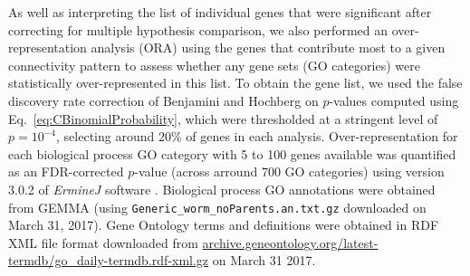 \documentclass[10pt,letterpaper]{article}
\begin{document}
As well as interpreting the list of individual genes that were significant after correcting for multiple hypothesis comparison, we also performed an over-representation analysis (ORA) using the genes that contribute most to a given connectivity pattern to assess whether any gene sets (GO categories) were statistically over-represented in this list.
To obtain the gene list, we used the false discovery rate correction of Benjamini and Hochberg \cite{Benjamini:1995cd} on $p$-values computed using Eq.~\eqref{eq:CBinomialProbability}, which were thresholded at a stringent level of $p = 10^{-4}$, selecting around $20\%$ of genes in each analysis.
Over-representation for each biological process GO category with 5 to 100 genes available was quantified as an FDR-corrected $p$-value (across arround 700 GO categories) using version 3.0.2 of \emph{ErmineJ} software \cite{Gillis2010}.
Biological process GO annotations \cite{Ashburner2000} were obtained from GEMMA \cite{Zoubarev2012} (using \texttt{Generic\_worm\_noParents.an.txt.gz} downloaded on March 31, 2017).
Gene Ontology terms and definitions were obtained in RDF XML file format downloaded from \url{archive.geneontology.org/latest-termdb/go_daily-termdb.rdf-xml.gz} on March 31 2017.

\end{document}
